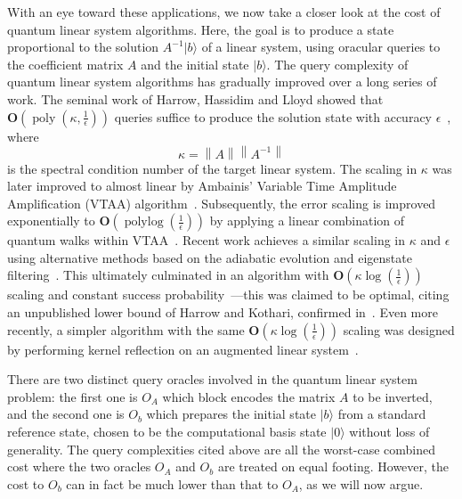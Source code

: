 \documentclass[letterpaper,onecolumn,11pt,accepted=2026-02-14]{quantumarticle}
\newcommand{\norm}[1]{\left\lVert#1\right\rVert}
\DeclareMathOperator{\poly}{poly}
\DeclareMathOperator{\polylog}{polylog}
\theoremstyle{remark}
\theoremstyle{plain}
\newcommand{\ket}[1]{|#1\rangle}
\begin{document}
With an eye toward these applications, we now take a closer look at the cost of quantum linear system algorithms. Here, the goal is to produce a state proportional to the solution $A^{-1}\ket{b}$ of a linear system, using oracular queries to the coefficient matrix $A$ and the initial state $\ket{b}$.
The query complexity of quantum linear system algorithms has gradually improved over a long series of work. The seminal work of Harrow, Hassidim and Lloyd showed that $\mathbf{O}\left(\poly\left(\kappa,\frac{1}{\epsilon}\right)\right)$ queries suffice to produce the solution state with accuracy $\epsilon$~\cite{Harrow2009}, where
\begin{equation}
    \kappa=\norm{A}\norm{A^{-1}}
\end{equation}
is the spectral condition number of the target linear system. The scaling in $\kappa$ was later improved to almost linear by Ambainis' Variable Time Amplitude Amplification (VTAA) algorithm~\cite{Ambainis2012VTAA}. Subsequently, the error scaling is improved exponentially to $\mathbf{O}\left(\polylog\left(\frac{1}{\epsilon}\right)\right)$ by applying a linear combination of quantum walks within VTAA~\cite{Childs2015LinearSystems}. Recent work achieves a similar scaling in $\kappa$ and $\epsilon$ using alternative methods based on the adiabatic evolution and eigenstate filtering~\cite{Subasi2019QLSPadiabatic,An2022QSLP,Lin2020QLSPfiltering}. This ultimately culminated in an algorithm with $\mathbf{O}\left(\kappa\log\left(\frac{1}{\epsilon}\right)\right)$ scaling and constant success probability~\cite{Costa2021linearsystems}---this was claimed to be optimal, citing an unpublished lower bound of Harrow and Kothari, confirmed in~\cite[Appendix A]{Costa2023constant}. Even more recently, a simpler algorithm with the same $\mathbf{O}\left(\kappa\log\left(\frac{1}{\epsilon}\right)\right)$ scaling was designed by performing kernel reflection on an augmented linear system~\cite{Dalzell2024shortcut}.

There are two distinct query oracles involved in the quantum linear system problem: the first one is $O_A$ which block encodes the matrix $A$ to be inverted, and the second one is $O_b$ which prepares the initial state $\ket{b}$ from a standard reference state, chosen to be the computational basis state $\ket{0}$ without loss of generality. The query complexities cited above are all the worst-case combined cost where the two oracles $O_A$ and $O_b$ are treated on equal footing. However, the cost to $O_b$ can in fact be much lower than that to $O_A$, as we will now argue.
\end{document}
